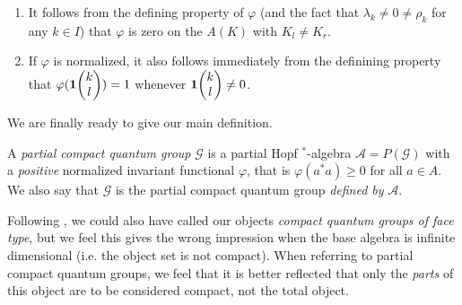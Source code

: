 \begin{Rem} 
\begin{enumerate}
\item It follows from the defining property of $\varphi$ (and the fact that $\lambda_k\neq 0\neq \rho_k$ for any $k\in I$) that $\varphi$ is zero on the $A(K)$ with $K_l\neq K_r$. 
\item If $\varphi$ is normalized, it also follows immediately from the definining property that $\varphi(\mathbf{1}\!\begin{pmatrix} k \\ l\end{pmatrix})=1$ whenever $\mathbf{1}\!\begin{pmatrix} k \\ l\end{pmatrix}\neq 0$.
\end{enumerate}
\end{Rem} 

We are finally ready to give our main definition.

\begin{Def} A \emph{partial compact quantum group} $\mathscr{G}$ is a partial Hopf $^*$-algebra $\mathscr{A} = P(\mathscr{G})$ with a \emph{positive} normalized invariant functional $\varphi$, that is $\varphi(a^*a)\geq 0$ for all $a\in A$. We also say that $\mathscr{G}$ is the partial compact quantum group \emph{defined by} $\mathscr{A}$.
\end{Def} 

\begin{Rem} Following \cite{Hay1}, we could also have called our objects \emph{compact quantum groups of face type}, but we feel this gives the wrong impression when the base algebra is infinite dimensional (i.e. the object set is not compact). When referring to partial compact quantum groups, we feel that it is better reflected that only the \emph{parts} of this object are to be considered compact, not the total object. %
\end{Rem} 



